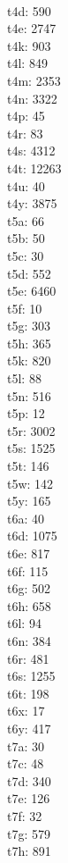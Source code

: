 \begin{multicols}{8}
  \\ t4d: 590
  \\ t4e: 2747
  \\ t4k: 903
  \\ t4l: 849
  \\ t4m: 2353
  \\ t4n: 3322
  \\ t4p: 45
  \\ t4r: 83
  \\ t4s: 4312
  \\ t4t: 12263
  \\ t4u: 40
  \\ t4y: 3875
  \\ t5a: 66
  \\ t5b: 50
  \\ t5c: 30
  \\ t5d: 552
  \\ t5e: 6460
  \\ t5f: 10
  \\ t5g: 303
  \\ t5h: 365
  \\ t5k: 820
  \\ t5l: 88
  \\ t5n: 516
  \\ t5p: 12
  \\ t5r: 3002
  \\ t5s: 1525
  \\ t5t: 146
  \\ t5w: 142
  \\ t5y: 165
  \\ t6a: 40
  \\ t6d: 1075
  \\ t6e: 817
  \\ t6f: 115
  \\ t6g: 502
  \\ t6h: 658
  \\ t6l: 94
  \\ t6n: 384
  \\ t6r: 481
  \\ t6s: 1255
  \\ t6t: 198
  \\ t6x: 17
  \\ t6y: 417
  \\ t7a: 30
  \\ t7c: 48
  \\ t7d: 340
  \\ t7e: 126
  \\ t7f: 32
  \\ t7g: 579
  \\ t7h: 891

\end{multicols}
